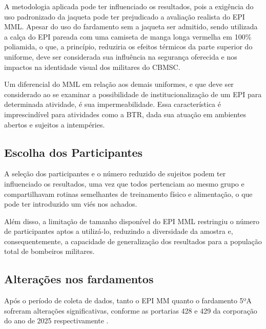             A metodologia aplicada pode ter influenciado os resultados, pois a exigência do uso 
            padronizado da jaqueta pode ter prejudicado a avaliação realista do \acrshort{EPI} \acrshort{MML}.
            Apesar do uso do fardamento sem a jaqueta ser admitido, sendo utilizada a calça do \acrshort{EPI} 
            pareada com uma camiseta de manga longa vermelha em 100\% poliamida, o que, a princípio, 
            reduziria os efeitos térmicos da parte superior do uniforme, deve ser considerada sua 
            influência na segurança oferecida e nos impactos na identidade visual dos militares 
            do \acrshort{CBMSC}.

            Um diferencial do \acrshort{MML} em relação aos demais uniformes, e que deve ser 
            considerado ao se examinar a possibilidade de institucionalização de um \acrshort{EPI} 
            para determinada atividade, é sua impermeabilidade. Essa característica é imprescindível 
            para atividades como a \acrlong{BTR}, dada sua atuação em ambientes abertos e sujeitos a 
            intempéries.
        
        \subsection{Escolha dos Participantes}
            A seleção dos participantes e o número reduzido de sujeitos podem ter influenciado os 
            resultados, uma vez que todos pertenciam ao mesmo grupo e compartilhavam rotinas 
            semelhantes de treinamento físico e alimentação, o que pode ter introduzido um viés nos achados.

            Além disso, a limitação de tamanho disponível do \acrshort{EPI} \acrshort{MML} restringiu o número de 
            participantes aptos a utilizá-lo, reduzindo a diversidade da amostra e, consequentemente, 
            a capacidade de generalização dos resultados para a população total de bombeiros militares.
        
        \subsection{Alterações nos fardamentos}
            Após o período de coleta de dados, tanto o EPI \acrshort{MM} quanto o fardamento 5ºA sofreram 
            alterações significativas, conforme as portarias 428 e 429 da corporação do ano de 2025 
            respectivamente \cite{portaria428MM}\cite{portaria4295A}.

